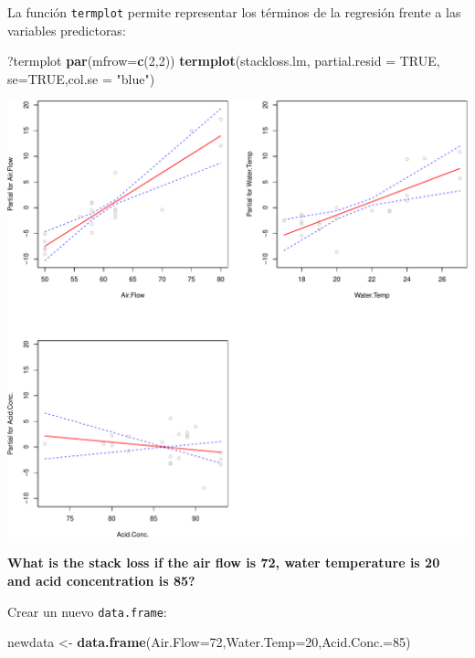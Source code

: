 \documentclass[]{article}
\newenvironment{Shaded}{\begin{snugshade}}{\end{snugshade}}
\newcommand{\KeywordTok}[1]{\textcolor[rgb]{0.13,0.29,0.53}{\textbf{{#1}}}}
\newcommand{\DataTypeTok}[1]{\textcolor[rgb]{0.13,0.29,0.53}{{#1}}}
\newcommand{\DecValTok}[1]{\textcolor[rgb]{0.00,0.00,0.81}{{#1}}}
\newcommand{\StringTok}[1]{\textcolor[rgb]{0.31,0.60,0.02}{{#1}}}
\newcommand{\OtherTok}[1]{\textcolor[rgb]{0.56,0.35,0.01}{{#1}}}
\newcommand{\NormalTok}[1]{{#1}}
\numberwithin{equation}{section}
\begin{document}
La función \texttt{termplot} permite representar los términos de la
regresión frente a las variables predictoras:

\begin{Shaded}
\begin{Highlighting}[]
\NormalTok{?termplot}
\KeywordTok{par}\NormalTok{(}\DataTypeTok{mfrow=}\KeywordTok{c}\NormalTok{(}\DecValTok{2}\NormalTok{,}\DecValTok{2}\NormalTok{))}
\KeywordTok{termplot}\NormalTok{(stackloss.lm, }\DataTypeTok{partial.resid =} \OtherTok{TRUE}\NormalTok{, }\DataTypeTok{se=}\OtherTok{TRUE}\NormalTok{,}\DataTypeTok{col.se =} \StringTok{"blue"}\NormalTok{)}
\end{Highlighting}
\end{Shaded}

\includegraphics{tema6_files/figure-latex/unnamed-chunk-31-1.pdf}

\textbf{What is the stack loss if the air flow is 72, water temperature
is 20 and acid concentration is 85?}

Crear un nuevo \texttt{data.frame}:

\begin{Shaded}
\begin{Highlighting}[]
\NormalTok{newdata <-}\StringTok{ }\KeywordTok{data.frame}\NormalTok{(}\DataTypeTok{Air.Flow=}\DecValTok{72}\NormalTok{,}\DataTypeTok{Water.Temp=}\DecValTok{20}\NormalTok{,}\DataTypeTok{Acid.Conc.=}\DecValTok{85}\NormalTok{)}
\end{Highlighting}
\end{Shaded}
\end{document}
